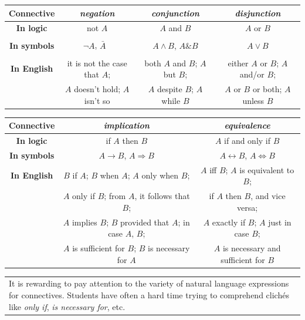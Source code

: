 \documentclass[12pt,notitlepage]{article}
\theoremstyle{plain}
\theoremstyle{definition}
\theoremstyle{plain}
\newcommand{\1}{\mathbf{1}}
\newcommand{\0}{\mathbf{0}}
\newcommand{\mcomm}[1]{
\medskip\noindent\begin{tabular}{| l}
\parbox{0.99\textwidth}{{\small
#1 }}\end{tabular}
\smallskip}
\begin{document}
\begin{center}
\begin{tabular}{|c | c | c | c |}
\hline
{\bf Connective} & \it negation  & \it conjunction & \it disjunction \\
\hline
\bf In logic & not $A$  &$A$ and $B$&$A$ or $B$\\
\hline
\bf In symbols & $\neg A$, $\bar A\phantom{\dfrac{1}{2}}$  &$A \wedge B$, $A \mathop{\&} B$&$A \vee B$\\
\hline
\bf In English & it is not the case that $A$; &both $A$ and $B$; $A$ but $B$; & either $A$ or $B$; $A$ and/or $B$; \\
&   $A$ doesn't hold; $A$ isn't so &  $A$ despite $B$; $A$ while $B$ & $A$ or $B$ or both; $A$ unless $B$\\
\hline
\end{tabular}

\vspace{10mm}

\begin{tabular}{|c | c | c |}
\hline
\bf Connective & \it implication & \it equivalence \\
\hline
\bf In logic & if $A$ then $B$ &$A$ if and only if $B$\\
\hline
\bf In symbols & $A \to B$, $A \Rightarrow B$ &$A \leftrightarrow B$, $A \Leftrightarrow B$\\
\hline
\bf In English & $B$ if $A$; $B$ when $A$; $A$ only when $B$;   & $A$ iff $B$; $A$ is equivalent to $B$; \\
&$A$ only if $B$; from $A$, it follows that $B$; & if $A$ then $B$, and vice versa;  \\
&$A$ implies $B$; $B$ provided that $A$; in case $A$, $B$;  & $A$ exactly if $B$; $A$ just in case $B$; \\
& $A$ is sufficient for $B$; $B$ is necessary for $A$ & $A$ is necessary and sufficient for $B$ \\
\hline
\end{tabular}
\end{center}
\mcomm{It is rewarding to pay attention to the variety of natural language expressions for connectives. Students have often a hard time trying to comprehend clich\'es like \emph{only if}, \emph{{is necessary for}}, etc.}
\end{document}
